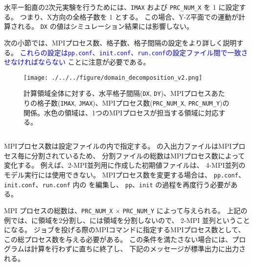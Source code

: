 水平ー鉛直の2次元実験を行うためには、\texttt{IMAX} および \texttt{PRC\_NUM\_X} を 1 に設定する。
つまり、X方向の全格子数を 1 とする。
この場合、Y-Z平面での運動が計算される。
\texttt{DX} の値はシミュレーション結果には影響しない。

次の小節では、MPIプロセス数、格子数、格子間隔の設定をより詳しく説明する。
\textcolor{blue}{これらの設定は\texttt{pp.conf}、\texttt{init.conf}、\texttt{run.conf}の設定ファイル間で一致させなければならない}
ことに注意が必要である。

\begin{figure}[h]
\begin{center}
  \texttt{[image: ./../../figure/domain\_decomposition\_v2.png]}\\
  \caption{計算領域全体に対する、水平格子間隔(\texttt{DX}, \texttt{DY})、MPIプロセスあたりの格子数(\texttt{IMAX}, \texttt{JMAX})、MPIプロセス数(\texttt{PRC\_NUM\_X}, \texttt{PRC\_NUM\_Y})の関係。水色の領域は、1つのMPIプロセスが担当する領域に対応する。}
  \label{fig:domain}
\end{center}
\end{figure}

\subsection{\SubsecMPIProcess} \label{subsec:relation_dom_reso2}

MPIプロセス数は設定ファイルの内で指定する。
\scalerm の入出力ファイルはMPIプロセス毎に分割されているため、
分割ファイルの総数はMPIプロセス数によって変化する。
例えば、2-MPI並列用に作成した初期値ファイルは、
4-MPI並列のモデル実行には使用できない。
MPIプロセス数を変更する場合は、
\verb|pp.conf|、\verb|init.conf|、\verb|run.conf| 内の
を編集し、
\verb|pp|、\verb|init| の過程を再度行う必要がある。

MPI プロセスの総数は、\verb|PRC_NUM_X| $\times$ \verb|PRC_NUM_Y|  によって与えられる。
上記の例では、\XDIR に領域を2分割し、\YDIR には領域を分割しないので、
2-MPI 並列ということになる。
ジョブを投げる際のMPIコマンドに指定するMPIプロセス数として、この総プロセス数を与える必要がある。
この条件を満たさない場合には、プログラムは計算を行わずに直ちに終了し、
下記のメッセージが標準出力に出力される。

